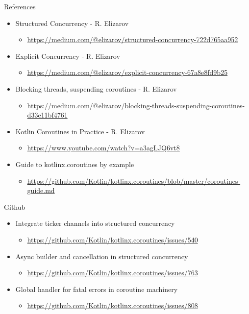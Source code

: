 \documentclass[10pt]{beamer}
\begin{document}
\begin{frame}{References}
		\begin{itemize}
			\item Structured Concurrency - R. Elizarov
				\begin{itemize}
					\item \url{https://medium.com/@elizarov/structured-concurrency-722d765aa952}
				\end{itemize}
			\item Explicit Concurrency - R. Elizarov
				\begin{itemize}
					\item \url{https://medium.com/@elizarov/explicit-concurrency-67a8e8fd9b25}
				\end{itemize}
			\item Blocking threads, suspending coroutines - R. Elizarov 
			\begin{itemize}
					\item \url{https://medium.com/@elizarov/blocking-threads-suspending-coroutines-d33e11bf4761}
				\end{itemize}
			\item Kotlin Coroutines in Practice - R. Elizarov 
			\begin{itemize}
					\item \url{https://www.youtube.com/watch?v=a3agLJQ6vt8}
				\end{itemize}
			\item Guide to kotlinx.coroutines by example 
				\begin{itemize}
					\item \url{https://github.com/Kotlin/kotlinx.coroutines/blob/master/coroutines-guide.md}
				\end{itemize}
		\end{itemize}
	\end{frame}

\begin{frame}{Github}
		\begin{itemize}
			\item Integrate ticker channels into structured concurrency
				\begin{itemize}
					\item \url{https://github.com/Kotlin/kotlinx.coroutines/issues/540}
				\end{itemize}
			\item Async builder and cancellation in structured concurrency				\begin{itemize}
					\item \url{https://github.com/Kotlin/kotlinx.coroutines/issues/763}
				\end{itemize}
			\item Global handler for fatal errors in coroutine machinery			\begin{itemize}
					\item \url{https://github.com/Kotlin/kotlinx.coroutines/issues/808}
				\end{itemize}
		\end{itemize}
	\end{frame}






\end{document}
